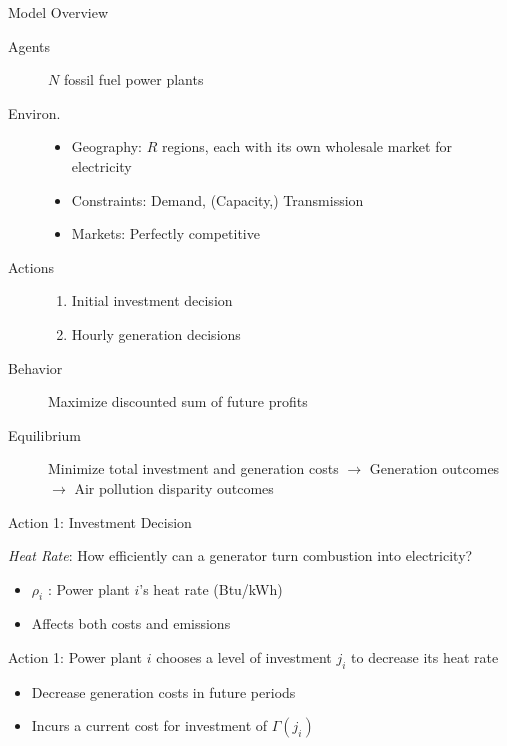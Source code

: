\documentclass[11pt, aspectratio = 169]{beamer}
\newcommand{\1}{\mathds{1}}
\begin{document}
\begin{frame}{Model Overview}

\begin{description}
    \item[Agents] $N$ fossil fuel power plants
    \vfill
    \item[Environ.]\begin{itemize}
        \item Geography: $R$ regions, each with its own wholesale market for electricity
        \item Constraints: Demand, (Capacity,) Transmission
        \item Markets: Perfectly competitive
    \end{itemize}  
    \vfill 
    \item[Actions]\begin{enumerate}
        \item Initial investment decision
        \item Hourly generation decisions
    \end{enumerate}
    \vfill
    \item[Behavior] Maximize discounted sum of future profits
    \vfill
    \item[Equilibrium] Minimize total investment and generation costs $\to$ Generation outcomes $\to$ Air pollution disparity outcomes 
\end{description}

\end{frame}


\begin{frame}{Action 1: Investment Decision}

\emph{Heat Rate}: How efficiently can a generator turn combustion into electricity?
\begin{itemize}
    \item $\rho_i$ : Power plant $i$'s heat rate (Btu/kWh)
    \item Affects both costs and emissions
\end{itemize}

\vfill
Action 1: Power plant $i$ chooses a level of investment $j_i$ to decrease its heat rate
\begin{itemize}
    \item Decrease generation costs in future periods
    \item Incurs a current cost for investment of $\Gamma(j_i)$
\end{itemize}

\end{frame}
\end{document}
